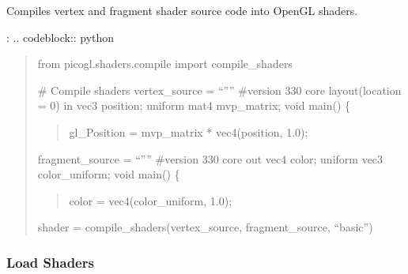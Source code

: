\documentclass[a4paper,10pt,english,openany,oneside]{sphinxmanual}
\begin{document}
\sphinxAtStartPar
Compiles vertex and fragment shader source code into OpenGL shaders.

\sphinxAtStartPar
{}:
.. code\sphinxhyphen{}block:: python
\begin{quote}

\sphinxAtStartPar
from picogl.shaders.compile import compile\_shaders

\sphinxAtStartPar
\# Compile shaders
vertex\_source = “””
\#version 330 core
layout(location = 0) in vec3 position;
uniform mat4 mvp\_matrix;
void main() \{
\begin{quote}

\sphinxAtStartPar
gl\_Position = mvp\_matrix * vec4(position, 1.0);
\end{quote}

\sphinxAtStartPar
fragment\_source = “””
\#version 330 core
out vec4 color;
uniform vec3 color\_uniform;
void main() \{
\begin{quote}

\sphinxAtStartPar
color = vec4(color\_uniform, 1.0);
\end{quote}

\sphinxAtStartPar
shader = compile\_shaders(vertex\_source, fragment\_source, “basic”)
\end{quote}


\subsubsection{Load Shaders}
\label{\detokenize{api/shaders:load-shaders}}
\end{document}

